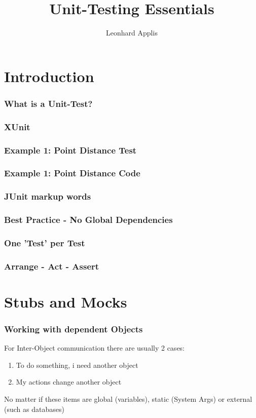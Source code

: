 \documentclass[12pt]{beamer}
\begin{document}
	\author{Leonhard Applis}
	\title{Unit-Testing Essentials}
	\begin{frame}[plain]
		\maketitle
	\end{frame}
	
	\section{Introduction}
	
	\begin{frame}
		\frametitle{What is a Unit-Test?}
	\end{frame}

	\begin{frame}
		\frametitle{XUnit}
	\end{frame}
	
	\begin{frame}
		\frametitle{Example 1: Point Distance Test}
	\end{frame}
	
	\begin{frame}
		\frametitle{Example 1: Point Distance Code}
	\end{frame}
	
	\begin{frame}
		\frametitle{JUnit markup words}
	\end{frame}

	\begin{frame}
		\frametitle{Best Practice - No Global Dependencies}
	\end{frame}
	
	\begin{frame}
		\frametitle{One 'Test' per Test}
	\end{frame}
	
	\begin{frame}
		\frametitle{Arrange - Act - Assert}
	\end{frame}
	
	\section{Stubs and Mocks}
	
	\begin{frame}
		\frametitle{Working with dependent Objects}
		For Inter-Object communication there are usually 2 cases:
		\begin{enumerate}
			\item To do something, i need another object
			\item My actions change another object
		\end{enumerate}
		No matter if these items are global (variables), static (System Args) or external (such as databases) 
	\end{frame}
\end{document}
